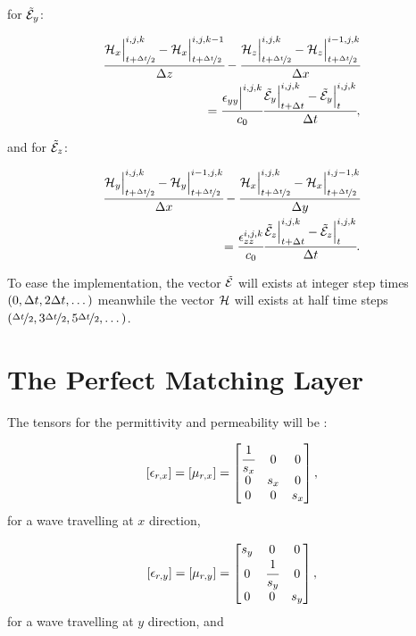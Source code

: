 for $\tilde{\mathcal{E}}_y$:

\begin{small}
    \begin{align}
        \cfrac{\mathcal{H}_x\Big|^{i,j,k}_{t+\nicefrac{\Delta t}{2}}-\mathcal{H}_x\Big|^{i,j,k-1}_{t+\nicefrac{\Delta t}{2}}}{\Delta z} - \cfrac{\mathcal{H}_z\Big|^{i,j,k}_{t+\nicefrac{\Delta t}{2}}-\mathcal{H}_z\Big|^{i-1,j,k}_{t+\nicefrac{\Delta t}{2}}}{\Delta x} \nonumber\\ =
        \cfrac{\epsilon_{yy}\Big|^{i,j,k}}{c_0}\cfrac{\tilde{\mathcal{E}}_y\Big|^{i,j,k}_{t+\Delta t}-\tilde{\mathcal{E}}_y\Big|^{i,j,k}_{t}}{\Delta t},
        \label{eq:fd_ey}
    \end{align}
\end{small}
and for $\tilde{\mathcal{E}}_z$:

\begin{small}
    \begin{align}
        \cfrac{\mathcal{H}_y\Big|^{i,j,k}_{t+\nicefrac{\Delta t}{2}}-\mathcal{H}_y\Big|^{i-1,j,k}_{t+\nicefrac{\Delta t}{2}}}{\Delta x} - \cfrac{\mathcal{H}_x\Big|^{i,j,k}_{t+\nicefrac{\Delta t}{2}}-\mathcal{H}_x\Big|^{i,j-1,k}_{t+\nicefrac{\Delta t}{2}}}{\Delta y} \nonumber\\
        =
        \cfrac{\epsilon_{zz}^{i,j,k}}{c_0}\cfrac{\tilde{\mathcal{E}}_z\Big|^{i,j,k}_{t+\Delta t}-\tilde{\mathcal{E}}_z\Big|^{i,j,k}_{t}}{\Delta t}.
        \label{eq:fd_ez}
    \end{align}
\end{small}

To ease the implementation, the vector $\tilde{\mathcal{E}}$ will exists at integer step times $(0, \Delta t, 2\Delta t, \dots)$ meanwhile the vector $\mathcal{H}$ will exists at half time steps $(\nicefrac{\Delta t}{2}, 3\nicefrac{\Delta t}{2}, 5\nicefrac{\Delta t}{2}, \dots)$.

\section{The Perfect Matching Layer}

The tensors for the permittivity and permeability will be \cite{rumpf_book}:

\begin{equation}
    \brackets{\epsilon_{r,x}} = \brackets{\mu_{r,x}} = \begin{bmatrix}
        \cfrac{1}{s_x} & 0 & 0 \\
        0 & s_x & 0 \\
        0 & 0 & s_x
    \end{bmatrix},
\end{equation}
for a wave travelling at $x$ direction,

\begin{equation}
    \brackets{\epsilon_{r,y}} = \brackets{\mu_{r,y}} = \begin{bmatrix}
        s_y & 0 & 0 \\
        0 & \cfrac{1}{s_y} & 0 \\
        0 & 0 & s_y
    \end{bmatrix},
\end{equation}
for a wave travelling at $y$ direction, and

